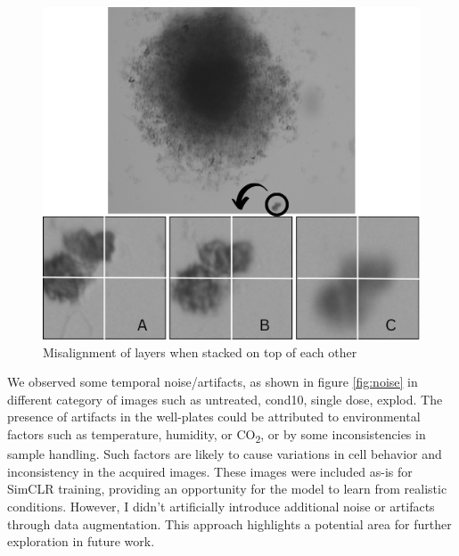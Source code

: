  \begin{figure}[H]
  \centering
  \includegraphics[scale=0.4]{figures/posi.png} 
  \caption{Misalignment of layers when stacked on top of each other}
  \label{fig:Misalignment}
\end{figure}

We observed some temporal noise/artifacts, as shown in figure  \ref{fig:noise} in different category of images such as untreated, cond10, single dose, explod. The presence of artifacts in the well-plates could be attributed to environmental factors such
as temperature, humidity, or CO\textsubscript{2}, or by some inconsistencies in sample handling. Such factors are likely to cause variations in cell behavior and
inconsistency in the  acquired images. These images were included as-is for SimCLR training, providing an opportunity for the model to learn from realistic conditions. 
However, I didn't artificially introduce additional noise or artifacts through data augmentation. This approach highlights a potential area for further exploration in future work.
  
